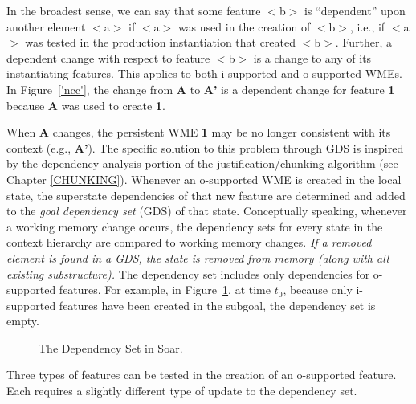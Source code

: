 In the broadest sense, we can say that some feature $<$b$>$ is ``dependent'' upon another element $<$a$>$ if $<$a$>$ was used in the creation of $<$b$>$, i.e., if $<$a$>$ was tested in the production instantiation that created $<$b$>$. Further, a dependent change with respect to feature $<$b$>$ is a change to any of its instantiating features. This applies to both i-supported and o-supported WMEs. In Figure~\ref{'ncc'}, the change from {\bf A} to {\bf A'} is a dependent change for feature {\bf 1} because {\bf A} was used to create {\bf 1}.


When {\bf A} changes, the persistent WME {\bf 1} may be no longer consistent with its context (e.g., {\bf A'}).  The specific solution to this problem through GDS is inspired by the dependency analysis portion of the justification/chunking algorithm (see Chapter \ref{CHUNKING}). Whenever an o-supported WME is created in the local state, the superstate dependencies of that new feature are determined and added to the {\em goal dependency set} (GDS) of that state. Conceptually speaking, whenever a working memory change occurs, the dependency sets for every state in the context hierarchy are compared to working memory changes. \textit{If a removed element  is found in a GDS, the state is removed from memory (along with all existing substructure).} The dependency set includes only dependencies for o-supported features.  For example, in Figure~\ref{'gds'}, at time $t_0$, because only i-supported features have been created in the subgoal, the dependency set is empty.

\begin{figure}
	\caption{The Dependency Set in Soar.}
	\label{'gds'}
\end{figure}


Three types of features can be tested in the creation of an o-supported feature.  Each requires a slightly different type of update to the dependency set.

